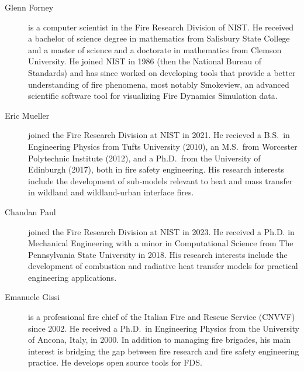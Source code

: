 \begin{description}
\item[Glenn Forney] is a computer scientist in the Fire Research Division of NIST.  He received a bachelor of science degree in mathematics from Salisbury State College and a master of science and a doctorate in mathematics from Clemson University.  He joined NIST in 1986 (then the National Bureau of Standards) and has since worked on developing tools that provide a better understanding of fire phenomena, most notably Smokeview, an advanced scientific software tool for visualizing Fire Dynamics Simulation data.

\item[Eric Mueller] joined the Fire Research Division at NIST in 2021. He recieved a B.S.~in Engineering Physics from Tufts University (2010), an M.S.~from Worcester Polytechnic Institute (2012), and a Ph.D.~from the University of Edinburgh (2017), both in fire safety engineering. His research interests include the development of sub-models relevant to heat and mass transfer in wildland and wildland-urban interface fires.

\item[Chandan Paul] joined the Fire Research Division at NIST in 2023. He received a Ph.D. in Mechanical Engineering with a minor in Computational Science from The Pennsylvania State University in 2018. His research interests include the development of combustion and radiative heat transfer models for practical engineering applications.



\item[Emanuele Gissi] is a professional fire chief of the Italian Fire and Rescue Service (CNVVF) since 2002. He received a Ph.D.~in Engineering Physics from the University of Ancona, Italy, in 2000. In addition to managing fire brigades, his main interest is bridging the gap between fire research and fire safety engineering practice. He develops open source tools for FDS.


\end{description}
